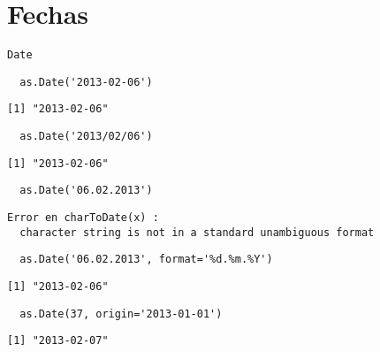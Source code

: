 \documentclass[xcolor={usenames,svgnames,dvipsnames}]{beamer}
\begin{document}
\section*{Fechas}
\label{sec-2}
\begin{frame}[fragile,label=sec-2-1]{\texttt{Date}}
 \lstset{language=R,label= ,caption= ,numbers=none}
\begin{lstlisting}
  as.Date('2013-02-06')
\end{lstlisting}

\begin{verbatim}
[1] "2013-02-06"
\end{verbatim}

\lstset{language=R,label= ,caption= ,numbers=none}
\begin{lstlisting}
  as.Date('2013/02/06')
\end{lstlisting}

\begin{verbatim}
[1] "2013-02-06"
\end{verbatim}

\lstset{language=R,label= ,caption= ,numbers=none}
\begin{lstlisting}
  as.Date('06.02.2013')
\end{lstlisting}

\begin{verbatim}
Error en charToDate(x) : 
  character string is not in a standard unambiguous format
\end{verbatim}

\lstset{language=R,label= ,caption= ,numbers=none}
\begin{lstlisting}
  as.Date('06.02.2013', format='%d.%m.%Y')
\end{lstlisting}

\begin{verbatim}
[1] "2013-02-06"
\end{verbatim}

\lstset{language=R,label= ,caption= ,numbers=none}
\begin{lstlisting}
  as.Date(37, origin='2013-01-01')
\end{lstlisting}

\begin{verbatim}
[1] "2013-02-07"
\end{verbatim}
\end{frame}
\end{document}
